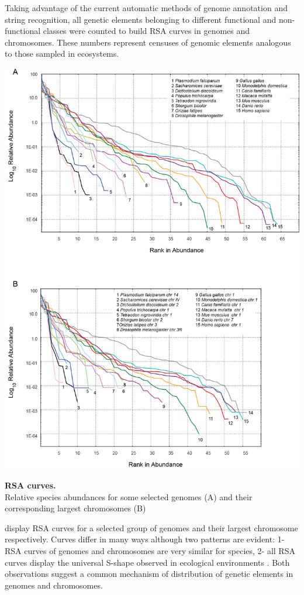 Taking advantage of the current automatic methods of genome annotation and string recognition, all genetic elements belonging to different functional and non-functional classes were counted to build RSA curves in genomes and chromosomes. These numbers represent censuses of genomic elements analogous to those sampled in ecosystems.

\begin{FPfigure}
\centering 
\includegraphics[width=\textwidth]{tex_source/figures/untb_genomes/SAD_genomes.png}
\caption[RSA curves.]{{\bf RSA curves.} \\ Relative species abundances for some selected genomes (A) and their corresponding largest chromosomes (B)} 
\label{fig:rsa_genomes}
\end{FPfigure}

 display RSA curves for a selected group of genomes and their largest chromosome respectively. Curves differ in many ways although two patterns are evident: 1- RSA curves of genomes and chromosomes are very similar for species, 2- all RSA curves display the universal S-shape observed in ecological environments \cite{McGill2007,Hubbell2001}. Both observations suggest a common mechanism of distribution of genetic elements in genomes and chromosomes.

